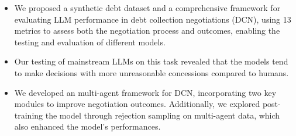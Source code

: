 \begin{itemize}[leftmargin=15px]
    
    \item We proposed a synthetic debt dataset and a comprehensive framework for evaluating LLM performance in debt collection negotiations (DCN), using 13 metrics to assess both the negotiation process and outcomes, enabling the testing and evaluation of different models.
    \item Our testing of mainstream LLMs on this task revealed that the models tend to make decisions with more unreasonable concessions compared to humans.
    \item We developed an multi-agent framework for DCN, incorporating two key modules to improve negotiation outcomes. Additionally, we explored post-training the model through rejection sampling on multi-agent data, which also enhanced the model’s performances.
    
\end{itemize}

